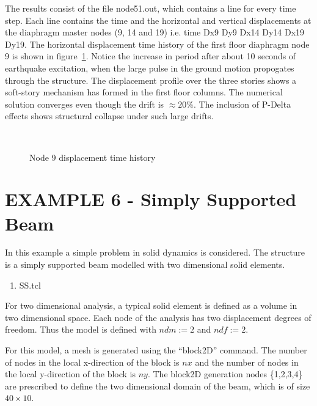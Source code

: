 \documentclass[12pt]{article}
\begin{document}
\vspace{0.2in} 

The results consist of the file node51.out, which contains a line for
every time step. Each line contains the time and the horizontal and
vertical displacements at the diaphragm master nodes (9, 14 and 19)
i.e. time Dx9 Dy9 Dx14 Dy14 Dx19 Dy19. The horizontal displacement
time history of the first floor diaphragm node 9 is shown in
figure~\ref{example4disp}. Notice the increase in period
after about 10 seconds of earthquake excitation, when the large pulse
in the ground motion propogates through the structure. The
displacement profile over the three stories shows a soft-story
mechanism has formed in the first floor columns. The numerical
solution converges even though the drift is
$\approx 20 \%$. The inclusion of P-Delta effects shows
structural collapse under such large drifts.

\begin{figure}[h]
\begin{center}
\leavevmode
\hbox{%
\epsfxsize=4.0in
\epsfysize=2.8in
}
\end{center}
\caption{Node 9 displacement time history}
\label{example4disp}
\end{figure}


\clearpage
\section {EXAMPLE 6 - Simply Supported Beam}

In this example a simple problem in solid dynamics is considered.
The structure is a simply supported beam modelled with two dimensional
solid elements.

\vspace{0.2in}  
\begin{enumerate} 
\item SS.tcl
\end{enumerate}

\vspace{0.2in} 

For two dimensional analysis, a typical solid element is defined as a volume 
in two dimensional space.  Each node of the analysis has two displacement
degrees of freedom.  Thus the model is defined with 
$ndm := 2$ and $ndf := 2$.

For this model, a mesh is generated using the ``block2D'' command.  The number of 
nodes in the local x-direction of the block is $nx$ and
the number of nodes in the local y-direction of the block is $ny$.
The block2D generation nodes \{1,2,3,4\} are prescribed to define 
the two dimensional domain of the beam, which is of size $40\times10$.
\end{document}
